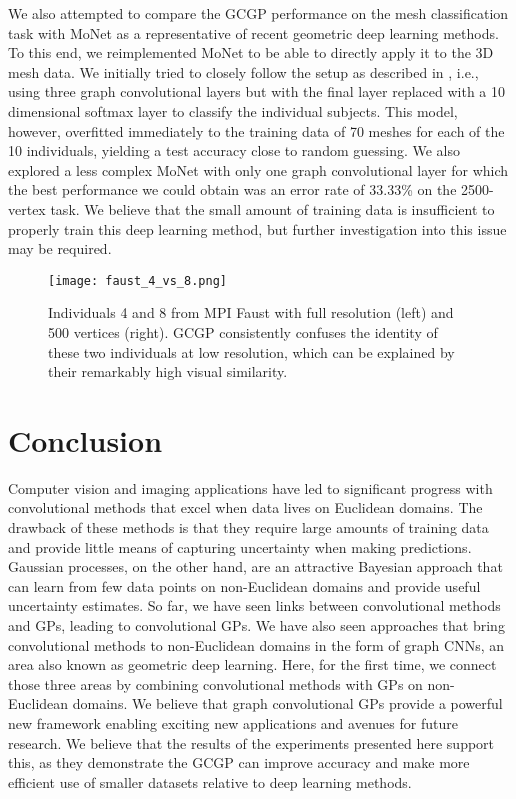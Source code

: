 \documentclass{article}
\begin{document}
We also attempted to compare the GCGP performance on the mesh classification task with MoNet as a representative of recent geometric deep learning methods. To this end, we reimplemented MoNet to be able to directly apply it to the 3D mesh data. We initially tried to closely follow the setup as described in \citep{moNet}, i.e., using three graph convolutional layers but with the final layer replaced with a 10 dimensional softmax layer to classify the individual subjects. This model, however, overfitted immediately to the training data of 70 meshes for each of the 10 individuals, yielding a test accuracy close to random guessing. We also explored a less complex MoNet with only one graph convolutional layer for which the best performance we could obtain was an error rate of 33.33\% on the 2500-vertex task. We believe that the small amount of training data is insufficient to properly train this deep learning method, but further investigation into this issue may be required.


\begin{figure}[t]
\centering
\texttt{[image: faust\_4\_vs\_8.png]}
\caption{Individuals 4 and 8 from MPI Faust with full resolution (left) and 500 vertices (right). GCGP consistently confuses the identity of these two individuals at low resolution, which can be explained by their remarkably high visual similarity.} \label{fig:faust_4_vs_8}
\vspace{-.3cm}
\end{figure}

\section{Conclusion}

Computer vision and imaging applications have led to significant progress with convolutional methods that excel when data lives on Euclidean domains. The drawback of these methods is that they require large amounts of training data and provide little means of capturing uncertainty when making predictions. Gaussian processes, on the other hand, are an attractive Bayesian approach that can learn from few data points on non-Euclidean domains and provide useful uncertainty estimates. So far, we have seen links between convolutional methods and GPs, leading to convolutional GPs. We have also seen approaches that bring convolutional methods to non-Euclidean domains in the form of graph CNNs, an area also known as geometric deep learning. Here, for the first time, we connect those three areas by combining convolutional methods with GPs on non-Euclidean domains. We believe that graph convolutional GPs provide a powerful new framework enabling exciting new applications and avenues for future research. We believe that the results of the experiments presented here support this, as they demonstrate the GCGP can improve accuracy and make more efficient use of smaller datasets relative to deep learning methods.
\end{document}
